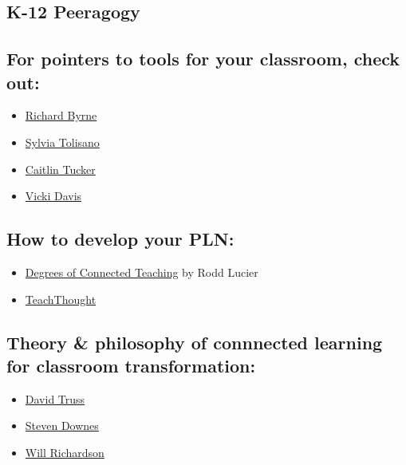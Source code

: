 \hypertarget{k-12-peeragogy}{%
\subsection{K-12 Peeragogy}\label{k-12-peeragogy}}

\hypertarget{for-pointers-to-tools-for-your-classroom-check-out}{%
\subsection{For pointers to tools for your classroom, check
out:}\label{for-pointers-to-tools-for-your-classroom-check-out}}

\begin{itemize}
\tightlist
\item
  \href{http://www.freetech4teachers.com/}{Richard Byrne}
\item
  \href{http://langwitches.org/blog/}{Sylvia Tolisano}
\item
  \href{http://catlintucker.com/2011/11/12-tech-tools-that-will-transform-your-classroom/}{Caitlin
  Tucker}
\item
  \href{http://coolcatteacher.blogspot.ca/}{Vicki Davis}
\end{itemize}

\hypertarget{how-to-develop-your-pln}{%
\subsection{How to develop your PLN:}\label{how-to-develop-your-pln}}

\begin{itemize}
\tightlist
\item
  \href{http://thecleversheep.blogspot.ca/2012/06/seven-degrees-of-connectedness_06.html}{Degrees
  of Connected Teaching} by Rodd Lucier
\item
  \href{http://thecleversheep.blogspot.ca/2012/06/seven-degrees-of-connectedness_06.html}{TeachThought}
\end{itemize}

\hypertarget{theory-philosophy-of-connnected-learning-for-classroom-transformation}{%
\subsection{Theory \& philosophy of connnected learning for classroom
transformation:}\label{theory-philosophy-of-connnected-learning-for-classroom-transformation}}

\begin{itemize}
\tightlist
\item
  \href{http://pairadimes.davidtruss.com/}{David Truss}
\item
  \href{http://www.downes.ca/presentation/264}{Steven Downes}
\item
  \href{http://willrichardson.com/}{Will Richardson}
\end{itemize}

